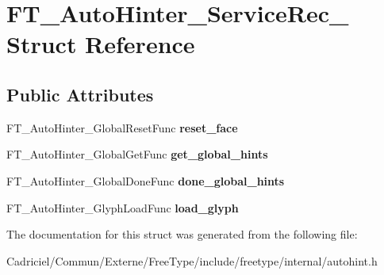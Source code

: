 \hypertarget{struct_f_t___auto_hinter___service_rec__}{}\section{F\+T\+\_\+\+Auto\+Hinter\+\_\+\+Service\+Rec\+\_\+ Struct Reference}
\label{struct_f_t___auto_hinter___service_rec__}
\subsection*{Public Attributes}
\begin{DoxyCompactItemize}
\item 
F\+T\+\_\+\+Auto\+Hinter\+\_\+\+Global\+Reset\+Func {\bfseries reset\+\_\+face}\hypertarget{struct_f_t___auto_hinter___service_rec___a846234a9c9c5427d3274e4568f33272c}{}\label{struct_f_t___auto_hinter___service_rec___a846234a9c9c5427d3274e4568f33272c}

\item 
F\+T\+\_\+\+Auto\+Hinter\+\_\+\+Global\+Get\+Func {\bfseries get\+\_\+global\+\_\+hints}\hypertarget{struct_f_t___auto_hinter___service_rec___a958371c33e08125393cd4b401a22f2a0}{}\label{struct_f_t___auto_hinter___service_rec___a958371c33e08125393cd4b401a22f2a0}

\item 
F\+T\+\_\+\+Auto\+Hinter\+\_\+\+Global\+Done\+Func {\bfseries done\+\_\+global\+\_\+hints}\hypertarget{struct_f_t___auto_hinter___service_rec___a648ac943fc1194f60ba638e0a59486e9}{}\label{struct_f_t___auto_hinter___service_rec___a648ac943fc1194f60ba638e0a59486e9}

\item 
F\+T\+\_\+\+Auto\+Hinter\+\_\+\+Glyph\+Load\+Func {\bfseries load\+\_\+glyph}\hypertarget{struct_f_t___auto_hinter___service_rec___ad36efe39469959626744ebdd04a04031}{}\label{struct_f_t___auto_hinter___service_rec___ad36efe39469959626744ebdd04a04031}

\end{DoxyCompactItemize}


The documentation for this struct was generated from the following file\+:\begin{DoxyCompactItemize}
\item 
Cadriciel/\+Commun/\+Externe/\+Free\+Type/include/freetype/internal/autohint.\+h\end{DoxyCompactItemize}
